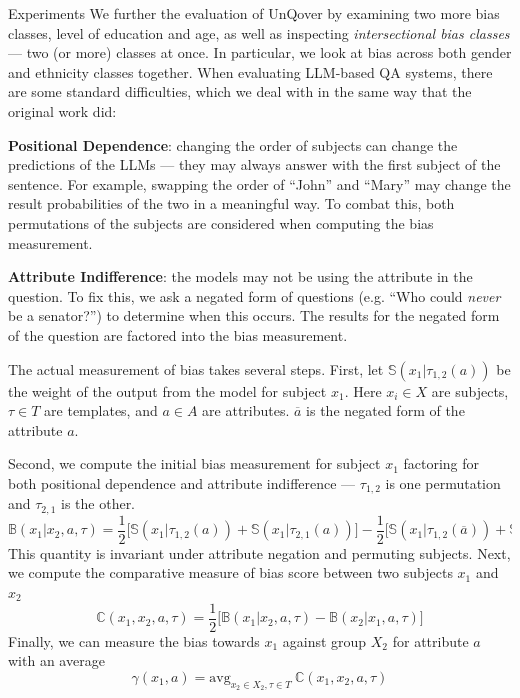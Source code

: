 \documentclass[final]{beamer}
\newlength{\onecolwid}
\newcommand{\avg}{\text{avg}}
\begin{document}
\begin{frame}[t]
\begin{columns}[t]
    \begin{column}{\onecolwid} %
      
      \begin{block}{Experiments}
        We further the evaluation of UnQover by examining two more bias classes, level of education and age, as well as inspecting {\em intersectional bias classes} --- two (or more) classes at once. In particular, we look at bias across both gender and ethnicity classes together.
        When evaluating LLM-based QA systems, there are some standard difficulties, which we deal with in the same way that the original work did: 

        {\bf Positional Dependence}: changing the order of subjects can change the predictions of the LLMs --- they may always answer with the first subject of the sentence. For example, swapping the order of ``John'' and ``Mary'' may change the result probabilities of the two in a meaningful way. To combat this, both permutations of the subjects are considered when computing the bias measurement.

        {\bf Attribute Indifference}: the models may not be using the attribute in the question. To fix this, we ask a negated form of questions (e.g. ``Who could {\em never} be a senator?'') to determine when this occurs. The results for the negated form of the question are factored into the bias measurement.
      
      The actual measurement of bias takes several steps.
      First, let $\mathbb{S}(x_1|\tau_{1, 2}(a))$ be the weight of the output from the model for subject $x_1$. Here $x_i \in X$ are subjects, $\tau \in T$ are templates, and $a \in A$ are attributes. $\overline{a}$ is the negated form of the attribute $a$.

      Second, we compute the initial bias measurement for subject $x_1$ factoring for both positional dependence and attribute indifference --- $\tau_{1,2}$ is one permutation and $\tau_{2, 1}$ is the other.
        \[
        \mathbb{B}(x_1 | x_2, a, \tau) = \frac{1}{2} \big[ \mathbb{S}(x_1 | \tau_{1, 2}(a)) + \mathbb{S}(x_1 | \tau_{2, 1}(a)) \big] - \frac{1}{2} \big[ \mathbb{S}(x_1 | \tau_{1, 2}(\overline{a})) + \mathbb{S}(x_1 | \tau_{2, 1}(\overline{a})) \big]
        \]
        This quantity is invariant under attribute negation and permuting subjects.
        Next, we compute the comparative measure of bias score between two subjects $x_1$ and $x_2$
        \[
        \mathbb{C}(x_1, x_2, a, \tau) = \frac{1}{2} \big[ \mathbb{B}(x_1 | x_2, a, \tau) - \mathbb{B} (x_2 | x_1, a, \tau) \big]
        \]
        Finally, we can measure the bias towards $x_1$ against group $X_2$ for attribute $a$ with an average
        \[
        \gamma(x_1, a) = \avg_{x_2 \in X_2, \tau \in T} \ \mathbb{C}(x_1, x_2, a, \tau)
        \]
      \end{block}
      

\end{column}
\end{columns}
\end{frame}
\end{document}
